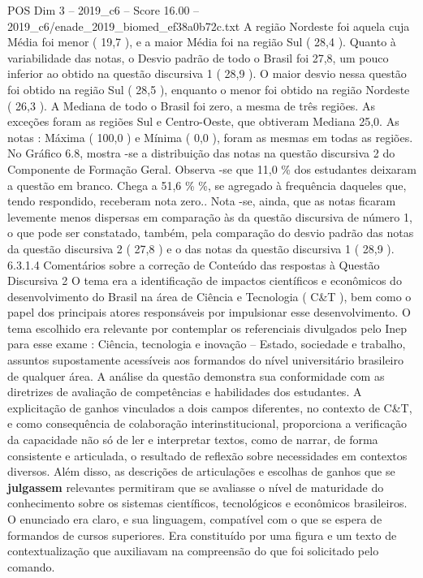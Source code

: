 \begin{textsample}{POS Dim 3 – 2019\_c6 – Score 16.00 – 2019\_c6/enade\_2019\_biomed\_ef38a0b72c.txt}
A região Nordeste foi aquela cuja Média foi menor ( 19,7 ), e a maior Média foi na região Sul ( 28,4 ).
Quanto à variabilidade das notas, o Desvio padrão de todo o Brasil foi 27,8, um pouco inferior ao obtido na questão discursiva 1 ( 28,9 ).
O maior desvio nessa questão foi obtido na região Sul ( 28,5 ), enquanto o menor foi obtido na região Nordeste ( 26,3 ).
A Mediana de todo o Brasil foi zero, a mesma de três regiões.
As exceções foram as regiões Sul e Centro-Oeste, que obtiveram Mediana 25,0.
As notas : Máxima ( 100,0 ) e Mínima ( 0,0 ), foram as mesmas em todas as regiões.
No Gráfico 6.8, mostra -se a distribuição das notas na questão discursiva 2 do Componente de Formação Geral.
Observa -se que 11,0 \% dos estudantes deixaram a questão em branco.
Chega a 51,6 \% \%, se agregado à frequência daqueles que, tendo respondido, receberam nota zero..
Nota -se, ainda, que as notas ficaram levemente menos dispersas em comparação às da questão discursiva de número 1, o que pode ser constatado, também, pela comparação do desvio padrão das notas da questão discursiva 2 ( 27,8 ) e o das notas da questão discursiva 1 ( 28,9 ). 6.3.1.4 Comentários sobre a correção de Conteúdo das respostas à Questão Discursiva 2 O tema era a identificação de impactos científicos e econômicos do desenvolvimento do Brasil na área de Ciência e Tecnologia ( C\&T ), bem como o papel dos principais atores responsáveis por impulsionar esse desenvolvimento.
O tema escolhido era relevante por contemplar os referenciais divulgados pelo Inep para esse exame : Ciência, tecnologia e inovação – Estado, sociedade e trabalho, assuntos supostamente acessíveis aos formandos do nível universitário brasileiro de qualquer área.
A análise da questão demonstra sua conformidade com as diretrizes de avaliação de competências e habilidades dos estudantes.
A explicitação de ganhos vinculados a dois campos diferentes, no contexto de C\&T, e como consequência de colaboração interinstitucional, proporciona a verificação da capacidade não só de ler e interpretar textos, como de narrar, de forma consistente e articulada, o resultado de reflexão sobre necessidades em contextos diversos.
Além disso, as descrições de articulações e escolhas de ganhos que se \textbf{julgassem} relevantes permitiram que se avaliasse o nível de maturidade do conhecimento sobre os sistemas científicos, tecnológicos e econômicos brasileiros.
O enunciado era claro, e sua linguagem, compatível com o que se espera de formandos de cursos superiores.
Era constituído por uma figura e um texto de contextualização que auxiliavam na compreensão do que foi solicitado pelo comando.

\end{textsample}
